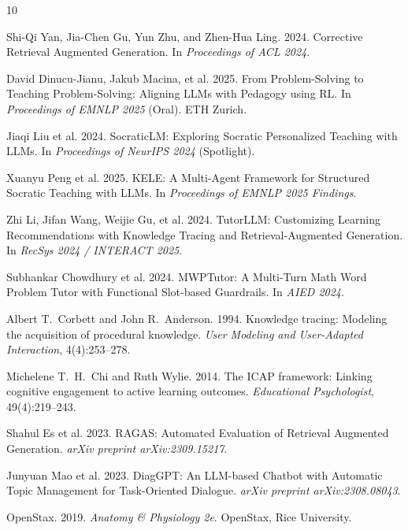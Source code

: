\documentclass[11pt]{article}
\begin{document}

\begin{thebibliography}{10}

Shi-Qi Yan, Jia-Chen Gu, Yun Zhu, and Zhen-Hua Ling. 2024.
\newblock Corrective Retrieval Augmented Generation.
\newblock In \emph{Proceedings of ACL 2024}.

David Dinucu-Jianu, Jakub Macina, et al. 2025.
\newblock From Problem-Solving to Teaching Problem-Solving: Aligning LLMs with
  Pedagogy using RL.
\newblock In \emph{Proceedings of EMNLP 2025} (Oral). ETH Zurich.

Jiaqi Liu et al. 2024.
\newblock SocraticLM: Exploring Socratic Personalized Teaching with LLMs.
\newblock In \emph{Proceedings of NeurIPS 2024} (Spotlight).

Xuanyu Peng et al. 2025.
\newblock KELE: A Multi-Agent Framework for Structured Socratic Teaching with
  LLMs.
\newblock In \emph{Proceedings of EMNLP 2025 Findings}.

Zhi Li, Jifan Wang, Weijie Gu, et al. 2024.
\newblock TutorLLM: Customizing Learning Recommendations with Knowledge Tracing
  and Retrieval-Augmented Generation.
\newblock In \emph{RecSys 2024 / INTERACT 2025}.

Subhankar Chowdhury et al. 2024.
\newblock MWPTutor: A Multi-Turn Math Word Problem Tutor with Functional
  Slot-based Guardrails.
\newblock In \emph{AIED 2024}.

Albert T.\ Corbett and John R.\ Anderson. 1994.
\newblock Knowledge tracing: Modeling the acquisition of procedural knowledge.
\newblock \emph{User Modeling and User-Adapted Interaction}, 4(4):253--278.

Michelene T.\ H.\ Chi and Ruth Wylie. 2014.
\newblock The ICAP framework: Linking cognitive engagement to active learning
  outcomes.
\newblock \emph{Educational Psychologist}, 49(4):219--243.

Shahul Es et al. 2023.
\newblock RAGAS: Automated Evaluation of Retrieval Augmented Generation.
\newblock \emph{arXiv preprint arXiv:2309.15217}.

Junyuan Mao et al. 2023.
\newblock DiagGPT: An LLM-based Chatbot with Automatic Topic Management for
  Task-Oriented Dialogue.
\newblock \emph{arXiv preprint arXiv:2308.08043}.

OpenStax. 2019.
\newblock \emph{Anatomy \& Physiology 2e}.
\newblock OpenStax, Rice University.

\end{thebibliography}
\end{document}
